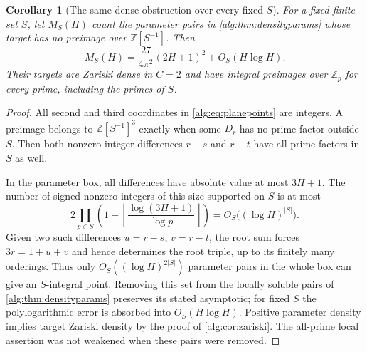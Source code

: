 \documentclass[11pt]{article}
\numberwithin{equation}{section}
\theoremstyle{plain}
\theoremstyle{plain}
\theoremstyle{plain}
\newtheorem{corollary}[corollary]{Corollary}
\theoremstyle{definition}
\theoremstyle{definition}
\theoremstyle{definition}
\theoremstyle{remark}
\newcommand{\Z}{\mathbb Z}\newcommand{\Q}{\mathbb Q}
\begin{document}
\begin{corollary}[The same dense obstruction over every fixed $S$]\label{alg:cor:Sdensity}
For a fixed finite set $S$, let $M_S(H)$ count the parameter pairs in
\cref{alg:thm:densityparams} whose target has no preimage over
$\Z[S^{-1}]$. Then
\[
 M_S(H)=\frac{27}{4\pi^2}(2H+1)^2+O_S(H\log H).
\]
Their targets are Zariski dense in $C=2$ and have integral preimages over
$\Z_p$ for every prime, including the primes of $S$.
\end{corollary}
\begin{proof}
All second and third coordinates in \eqref{alg:eq:planepoints} are integers.
A preimage belongs to $\Z[S^{-1}]^3$ exactly when some $D_r$ has no prime
factor outside $S$. Then both nonzero integer differences $r-s$ and
$r-t$ have all prime factors in $S$ as well.

In the parameter box, all differences have absolute value at most $3H+1$.
The number of signed nonzero integers of this size supported on $S$ is
at most
\[
 2\prod_{p\in S}\left(1+\left\lfloor\frac{\log(3H+1)}{\log p}\right\rfloor\right)
 =O_S\bigl((\log H)^{|S|}\bigr).
\]
Given two such differences $u=r-s$, $v=r-t$, the root sum forces
$3r=1+u+v$ and hence determines the root triple, up to its finitely many
orderings. Thus only $O_S((\log H)^{2|S|})$ parameter pairs in the whole
box can give an $S$-integral point. Removing this set from the locally
soluble pairs of \cref{alg:thm:densityparams} preserves its stated asymptotic;
for fixed $S$ the polylogarithmic error is absorbed into $O_S(H\log H)$.
Positive parameter density implies target Zariski density by the proof
of \cref{alg:cor:zariski}. The all-prime local assertion was not weakened
when these pairs were removed.
\end{proof}
\end{document}
